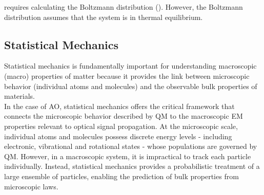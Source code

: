     \begin{table}[H]
            \caption{Polarizability derivatives
            \cite{Buldakov2000}}\label{tab:polarizabilityDerivatives}
    \end{table}

     requires calculating the Boltzmann
    distribution (). However, the Boltzmann
    distribution assumes that the system is in thermal equilibrium. \\
    
    \subsection{Statistical Mechanics}
    Statistical mechanics is fundamentally important for understanding
    macroscopic (macro) properties of matter because it provides the link
    between microscopic behavior (individual atoms and molecules) and the
    observable bulk properties of materials. \\

    In the case of \gls{AO}, statistical mechanics offers the critical
    framework that connects the microscopic behavior described by \gls{QM} to the
    macroscopic \gls{EM} properties relevant to optical signal propagation. At
    the microscopic scale, individual atoms and molecules possess discrete
    energy levels - including electronic, vibrational and rotational states -
    whose populations are governed by \gls{QM}. However, in a macroscopic
    system, it is impractical to track each particle individually. Instead,
    statistical mechanics provides a probabilistic treatment of a large
    ensemble of particles, enabling the prediction of bulk properties from
    microscopic laws.\\ 

